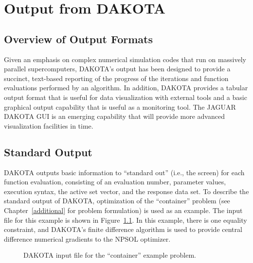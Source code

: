 \chapter{Output from DAKOTA}\label{output}

\section{Overview of Output Formats}\label{output:overview}

Given an emphasis on complex numerical simulation codes that run on
massively parallel supercomputers, DAKOTA's output has been designed
to provide a succinct, text-based reporting of the progress of the
iterations and function evaluations performed by an algorithm. In
addition, DAKOTA provides a tabular output format that is useful for
data visualization with external tools and a basic graphical output
capability that is useful as a monitoring tool. The JAGUAR DAKOTA GUI
is an emerging capability that will provide more advanced
visualization facilities in time.

\section{Standard Output}\label{output:standard}

DAKOTA outputs basic information to ``standard out'' (i.e., the
screen) for each function evaluation, consisting of an evaluation
number, parameter values, execution syntax, the active set vector, and
the response data set. To describe the standard output of DAKOTA,
optimization of the ``container'' problem (see
Chapter~\ref{additional} for problem formulation) is used as an
example. The input file for this example is shown in
Figure~\ref{output:incont}. In this example, there is one equality
constraint, and DAKOTA's finite difference algorithm is used to
provide central difference numerical gradients to the NPSOL optimizer.
\begin{figure}
  \begin{small}
    \begin{bigbox}
    \end{bigbox}
  \end{small}
  \caption{DAKOTA input file for the ``container'' example problem.}
  \label{output:incont}
\end{figure}

\clearpage

